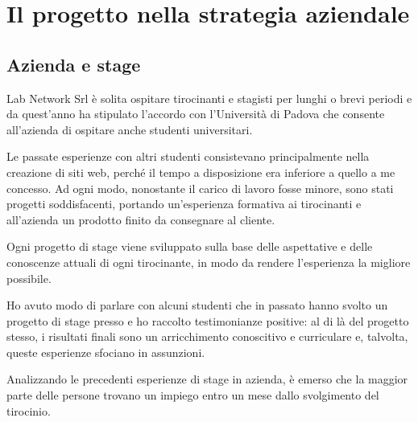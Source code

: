 
\chapter{Il progetto nella strategia aziendale}
\label{cap:processi-metodologie}

\section{Azienda e stage}

Lab Network Srl è solita ospitare tirocinanti e stagisti per lunghi o brevi periodi e da quest'anno ha stipulato l'accordo con l'Università di Padova che consente all'azienda di ospitare anche studenti universitari.

\medskip

Le passate esperienze con altri studenti consistevano principalmente nella creazione di siti web, perché il tempo a disposizione era inferiore a quello a me concesso. Ad ogni modo, nonostante il carico di lavoro fosse minore, sono stati progetti soddisfacenti, portando un'esperienza formativa ai tirocinanti e all'azienda un prodotto finito da consegnare al cliente.

Ogni progetto di stage viene sviluppato sulla base delle aspettative e delle conoscenze attuali di ogni tirocinante, in modo da rendere l'esperienza la migliore possibile.

Ho avuto modo di parlare con alcuni studenti che in passato hanno svolto un progetto di stage presso \lab{} e ho raccolto testimonianze positive: al di là del progetto stesso, i risultati finali sono un arricchimento conoscitivo e curriculare e, talvolta, queste esperienze sfociano in assunzioni.

Analizzando le precedenti esperienze di stage in azienda, è emerso che la maggior parte delle persone trovano un impiego entro un mese dallo svolgimento del tirocinio.

